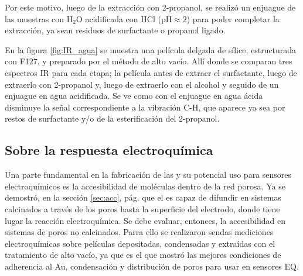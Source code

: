 			
		Por este motivo, luego de la extracción con 2-propanol, se realizó un enjuague de las muestras con H$_2$O acidificada con HCl (pH$\approx 2$) para poder completar la extracción, ya sean residuos de surfactante o propanol ligado.
				
		En la figura \ref{fig:IR_agua} se muestra una película delgada de sílice, estructurada con F127, y preparado por el método de alto vacío. Allí donde se comparan tres espectros IR para cada etapa; la película antes de extraer el surfactante, luego de extraerlo con 2-propanol y, luego de extraerlo con el alcohol y seguido de un enjuague en agua acidificada. Se ve como con el enjuague en agua ácida disminuye la señal correspondiente a la vibración C-H, que aparece ya sea por restos de surfactante y/o de la esterificación del 2-propanol.

	\subsection{Sobre la respuesta electroquímica}\label{sec:acc_eq}

	  Una parte fundamental en la fabricación de las \pdm\space y su potencial uso para sensores electroquímicos es la accesibilidad de moléculas dentro de la red porosa. Ya se demostró, en la sección \ref{sec:acc}, pág. \pageref{sec:acc} que el \aminorutenio\space es capaz de difundir en sistemas calcinados a través de los poros hasta la superficie del electrodo, donde tiene lugar la reacción electroquímica. Se debe evaluar, entonces,  la accesibilidad en sistemas de poros no calcinados. Parra ello se realizaron sendas mediciones electroquímicas sobre películas depositadas, condensadas y extraídas con el tratamiento de alto vacío, ya que es el que mostró las mejores condiciones de adherencia al Au, condensación y distribución de poros para usar en sensores EQ. 

